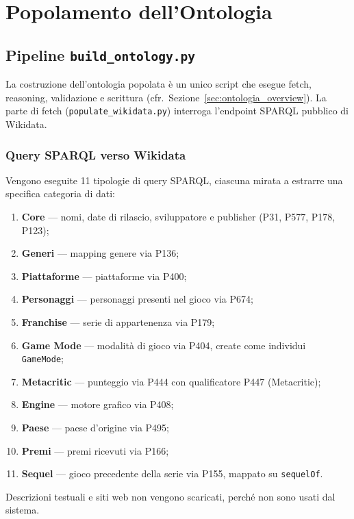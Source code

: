 \section{Popolamento dell'Ontologia}
\label{sec:popolamento}

\subsection{Pipeline \texttt{build\_ontology.py}}

La costruzione dell'ontologia popolata \`e un unico script che esegue fetch,
reasoning, validazione e scrittura (cfr.\ Sezione~\ref{sec:ontologia_overview}). La parte di
fetch (\texttt{populate\_wikidata.py}) interroga l'endpoint SPARQL pubblico di Wikidata.

\subsubsection{Query SPARQL verso Wikidata}

Vengono eseguite 11 tipologie di query SPARQL, ciascuna mirata a estrarre una
specifica categoria di dati:

\begin{enumerate}[nosep]
  \item \textbf{Core} --- nomi, date di rilascio, sviluppatore e publisher (P31, P577, P178, P123);
  \item \textbf{Generi} --- mapping genere via P136;
  \item \textbf{Piattaforme} --- piattaforme via P400;
  \item \textbf{Personaggi} --- personaggi presenti nel gioco via P674;
  \item \textbf{Franchise} --- serie di appartenenza via P179;
  \item \textbf{Game Mode} --- modalit\`a di gioco via P404, create come individui \texttt{GameMode};
  \item \textbf{Metacritic} --- punteggio via P444 con qualificatore P447 (Metacritic);
  \item \textbf{Engine} --- motore grafico via P408;
  \item \textbf{Paese} --- paese d'origine via P495;
  \item \textbf{Premi} --- premi ricevuti via P166;
  \item \textbf{Sequel} --- gioco precedente della serie via P155, mappato su \texttt{sequelOf}.
\end{enumerate}

Descrizioni testuali e siti web non vengono scaricati, perch\'e non sono usati dal sistema.

